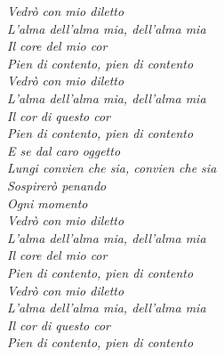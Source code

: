  \begin{dedication}\textit{
\hspace{8.5cm}Vedrò con mio diletto \\
\hspace{8.5cm}L'alma dell'alma mia, dell'alma mia  \\
\hspace{8.5cm}Il core del mio cor  \\
\hspace{8.5cm}Pien di contento, pien di contento  \\
\hspace{8.5cm}Vedrò con mio diletto \\
\hspace{8.5cm}L'alma dell'alma mia, dell'alma mia \\
\hspace{8.5cm}Il cor di questo cor \\
\hspace{8.5cm}Pien di contento, pien di contento \\
\hspace{8.5cm}E se dal caro oggetto \\
\hspace{8.5cm}Lungi convien che sia, convien che sia \\
\hspace{8.5cm}Sospirerò penando \\
\hspace{8.5cm}Ogni momento \\
\hspace{8.5cm}Vedrò con mio diletto \\
\hspace{8.5cm}L'alma dell'alma mia, dell'alma mia \\
\hspace{8.5cm}Il core del mio cor \\
\hspace{8.5cm}Pien di contento, pien di contento \\
\hspace{8.5cm}Vedrò con mio diletto \\
\hspace{8.5cm}L'alma dell'alma mia, dell'alma mia \\
\hspace{8.5cm}Il cor di questo cor \\
\hspace{8.5cm}Pien di contento, pien di contento \\
}
\end{dedication}

